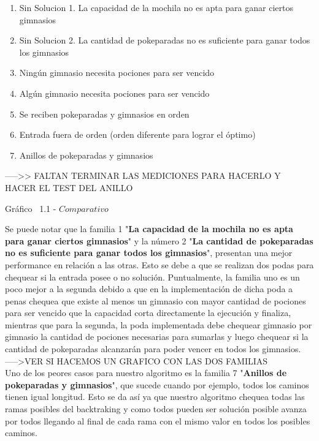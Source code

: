 \begin{enumerate}
\item Sin Solucion 1. La capacidad de la mochila no es apta para ganar ciertos gimnasios
\item Sin Solucion 2. La cantidad de pokeparadas no es suficiente para ganar todos los gimnasios
\item Ning\'un gimnasio necesita pociones para ser vencido
\item Alg\'un gimnasio necesita pociones para ser vencido
\item Se reciben pokeparadas y gimnasios en orden
\item Entrada fuera de orden (orden diferente para lograr el óptimo)
\item Anillos de pokeparadas y gimnasios
\end{enumerate}


----->> FALTAN TERMINAR LAS MEDICIONES PARA HACERLO Y HACER EL TEST DEL ANILLO\\
\vspace*{0.3cm} \vspace*{0.3cm}
  \begin{center}
 {Gr\'afico \ 1.1 - $Comparativo$}
  \end{center}
  \vspace*{0.3cm}
  
Se puede notar que la familia 1 "\textbf{La capacidad de la mochila no es apta para ganar ciertos gimnasios}" y la n\'umero 2 "\textbf{La cantidad de pokeparadas no es suficiente para ganar todos los gimnasios}", presentan una mejor performance en relaci\'on a las otras. Esto se debe a que se realizan dos podas para chequear si la entrada posee o no soluci\'on. Puntualmente, la familia uno es un poco mejor a la segunda debido a que en la implementaci\'on de dicha poda a penas chequea que existe al menos un gimnasio con mayor cantidad de pociones para ser vencido que la capacidad corta directamente la ejecuci\'on y finaliza, mientras que para la segunda, la poda implementada debe chequear gimnasio por gimnasio la cantidad de pociones necesarias para sumarlas y luego chequear si la cantidad de pokeparadas alcanzar\'an para poder vencer en todos los gimnasios.\\

----->VER SI HACEMOS UN GRAFICO CON LAS DOS FAMILIAS \\

Uno de los peores casos para nuestro algoritmo es la familia 7 "\textbf{Anillos de pokeparadas y gimnasios}", que sucede cuando por ejemplo, todos los caminos tienen igual longitud. Esto se da as\'i ya que nuestro algoritmo chequea todas las ramas posibles del backtraking y como todos pueden ser soluci\'on posible avanza por todos llegando al final de cada rama con el mismo valor en todos los posibles caminos.\\

